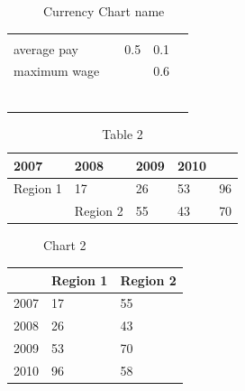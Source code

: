 \documentclass[11pt,a4paper]{article}
\begin{document}
\begin{figure}[h]
\caption{Currency Chart name}
\end{figure}

\begin{table}[h]
\begin{tabular}{|l|l|l|l|l|}
\hline
 &  &  &  &  \\ \hline
 &  &  &  &  \\ \hline
average pay &  & 0.5 & 0.1 &  \\ \hline
maximum wage &  &  & 0.6 &  \\ \hline
 &  &  &  &  \\ \hline
 &  &  &  &  \\ \hline
 &  &  &  &  \\ \hline
 &  &  &  &  \\ \hline
 &  &  &  &  \\ \hline
 &  &  &  &  \\ \hline
\end{tabular}
\end{table}

\begin{table}[h]
\caption{Table 2}
\begin{tabular}{|l|l|l|l|l|}
\hline
2007 & 2008 & 2009 & 2010 &  \\ \hline
Region 1 & 17 & 26 & 53 & 96 \\ \hline
 & Region 2 & 55 & 43 & 70 \\ \hline
\end{tabular}
\end{table}

\begin{figure}[h]
\caption{Chart 2}
\end{figure}

\begin{table}[h]
\begin{tabular}{|l|l|l|}
\hline
 & Region 1 & Region 2 \\ \hline
2007 & 17 & 55 \\ \hline
2008 & 26 & 43 \\ \hline
2009 & 53 & 70 \\ \hline
2010 & 96 & 58 \\ \hline
\end{tabular}
\end{table}
\end{document}
